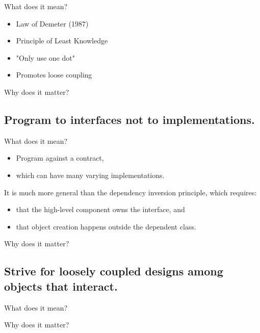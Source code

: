 \documentclass{beamer}
\begin{document}
\begin{frame}{What does it mean?}
    \begin{itemize}
        \item Law of Demeter (1987)
        \item Principle of Least Knowledge
        \item "Only use one dot"
        \item Promotes loose coupling
    \end{itemize}
\end{frame}

\begin{frame}{Why does it matter?}
\end{frame}

\begin{frame}{}
    
\end{frame}

\begin{frame}{}
    
\end{frame}

\subsection{Program to interfaces not to implementations.}

\begin{frame}{What does it mean?}
    \begin{itemize}
        \item Program against a contract, 
        \item which can have many varying implementations.
    \end{itemize}
    \par It is much more general than the dependency inversion principle, which requires:
    \begin{itemize}
        \item that the high-level component owns the interface, and
        \item that object creation happens outside the dependent class.
    \end{itemize}
\end{frame}

\begin{frame}{Why does it matter?}
\end{frame}

\begin{frame}{}
    
\end{frame}

\begin{frame}{}
    
\end{frame}

\subsection{Strive for loosely coupled designs among objects that interact.}

\begin{frame}{What does it mean?}
\end{frame}

\begin{frame}{Why does it matter?}
\end{frame}
\end{document}
